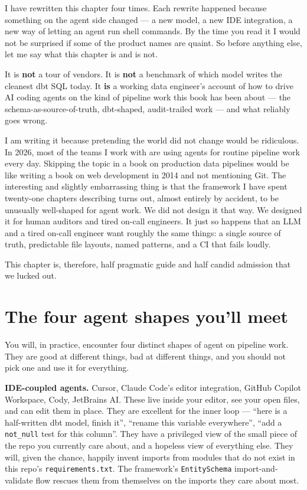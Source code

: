 \documentclass[
  11pt,
  british,
  oneside]{book}
\begin{document}
I have rewritten this chapter four times. Each rewrite happened because
something on the agent side changed --- a new model, a new IDE
integration, a new way of letting an agent run shell commands. By the
time you read it I would not be surprised if some of the product names
are quaint. So before anything else, let me say what this chapter is and
is not.

It is \textbf{not} a tour of vendors. It is \textbf{not} a benchmark of
which model writes the cleanest dbt SQL today. It \textbf{is} a working
data engineer's account of how to drive AI coding agents on the kind of
pipeline work this book has been about --- the
schema-as-source-of-truth, dbt-shaped, audit-trailed work --- and what
reliably goes wrong.

I am writing it because pretending the world did not change would be
ridiculous. In 2026, most of the teams I work with are using agents for
routine pipeline work every day. Skipping the topic in a book on
production data pipelines would be like writing a book on web
development in 2014 and not mentioning Git. The interesting and slightly
embarrassing thing is that the framework I have spent twenty-one
chapters describing turns out, almost entirely by accident, to be
unusually well-shaped for agent work. We did not design it that way. We
designed it for human auditors and tired on-call engineers. It just so
happens that an LLM and a tired on-call engineer want roughly the same
things: a single source of truth, predictable file layouts, named
patterns, and a CI that fails loudly.

This chapter is, therefore, half pragmatic guide and half candid
admission that we lucked out.

\hypertarget{the-four-agent-shapes-youll-meet}{%
\section{The four agent shapes you'll
meet}\label{the-four-agent-shapes-youll-meet}}

You will, in practice, encounter four distinct shapes of agent on
pipeline work. They are good at different things, bad at different
things, and you should not pick one and use it for everything.

\textbf{IDE-coupled
agents.} Cursor, Claude
Code's editor integration, GitHub Copilot Workspace, Cody, JetBrains AI.
These live inside your editor, see your open files, and can edit them in
place. They are excellent for the inner loop --- ``here is a
half-written dbt model, finish it'', ``rename this variable
everywhere'', ``add a \texttt{not\_null} test for this column''. They
have a privileged view of the small piece of the repo you currently care
about, and a hopeless view of everything else. They will, given the
chance, happily invent imports from modules that do not exist in this
repo's \texttt{requirements.txt}. The framework's \texttt{EntitySchema}
import-and-validate flow rescues them from themselves on the imports
they care about most.
\end{document}
